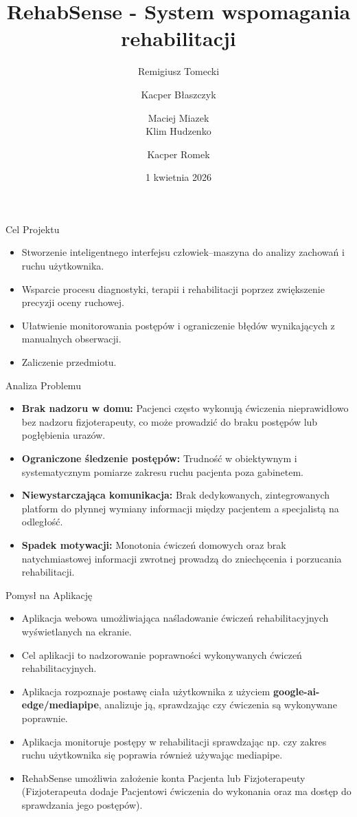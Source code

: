\documentclass{beamer}
\title[RehabSense]{RehabSense - System wspomagania rehabilitacji}
\author[RT, KB, MM, KH, KR]{
    Remigiusz Tomecki \and Kacper Błaszczyk \and Maciej Miazek \\
    Klim Hudzenko \and Kacper Romek
}
\institute[PŁ]{Politechnika Łódzka}
\date{1 kwietnia 2026}
\begin{document}
\begin{frame}
    \titlepage
\end{frame}

\begin{frame}{Cel Projektu}
    \begin{itemize}
        \item Stworzenie inteligentnego interfejsu człowiek–maszyna do analizy zachowań i ruchu użytkownika.
        \item Wsparcie procesu diagnostyki, terapii i rehabilitacji poprzez zwiększenie precyzji oceny ruchowej.
        \item Ułatwienie monitorowania postępów i ograniczenie błędów wynikających z manualnych obserwacji.
        \item Zaliczenie przedmiotu.
    \end{itemize}
\end{frame}

\begin{frame}{Analiza Problemu}
    \begin{itemize}
        \item \textbf{Brak nadzoru w domu:} Pacjenci często wykonują ćwiczenia nieprawidłowo bez nadzoru fizjoterapeuty, co może prowadzić do braku postępów lub pogłębienia urazów.
        \item \textbf{Ograniczone śledzenie postępów:} Trudność w obiektywnym i systematycznym pomiarze zakresu ruchu pacjenta poza gabinetem.
        \item \textbf{Niewystarczająca komunikacja:} Brak dedykowanych, zintegrowanych platform do płynnej wymiany informacji między pacjentem a specjalistą na odległość.
        \item \textbf{Spadek motywacji:} Monotonia ćwiczeń domowych oraz brak natychmiastowej informacji zwrotnej prowadzą do zniechęcenia i porzucania rehabilitacji.
    \end{itemize}
\end{frame}

\begin{frame}{Pomysł na Aplikację}
    \begin{itemize}
        \item Aplikacja webowa umożliwiająca naśladowanie ćwiczeń rehabilitacyjnych wyświetlanych na ekranie.
        \item Cel aplikacji to nadzorowanie poprawności wykonywanych ćwiczeń rehabilitacyjnych.
        \item Aplikacja rozpoznaje postawę ciała użytkownika z użyciem \textbf{google-ai-edge/mediapipe}, analizuje ją, sprawdzając czy ćwiczenia są wykonywane poprawnie.
        \item Aplikacja monitoruje postępy w rehabilitacji sprawdzając np. czy zakres ruchu użytkownika się poprawia również używając mediapipe.
        \item RehabSense umożliwia założenie konta Pacjenta lub Fizjoterapeuty (Fizjoterapeuta dodaje Pacjentowi ćwiczenia do wykonania oraz ma dostęp do sprawdzania jego postępów).
    \end{itemize}
\end{frame}
\end{document}
